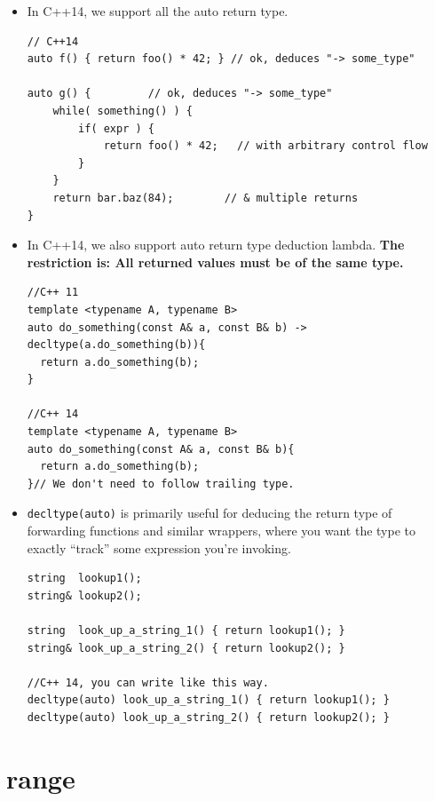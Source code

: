 \documentclass[a4paper,11pt,twoside]{book}
\begin{document}
\begin{itemize}
		\item In C++14, we support all the auto return type. 

\begin{lstlisting}
// C++14
auto f() { return foo() * 42; } // ok, deduces "-> some_type"

auto g() {         // ok, deduces "-> some_type"
    while( something() ) {
        if( expr ) {
            return foo() * 42;   // with arbitrary control flow
        }
    }
    return bar.baz(84);        // & multiple returns
}              
\end{lstlisting}

		\item In C++14, we also support auto return type deduction lambda. \textbf{The restriction is: All returned values must be of the same type.}

\begin{lstlisting}
//C++ 11
template <typename A, typename B>
auto do_something(const A& a, const B& b) -> decltype(a.do_something(b)){
  return a.do_something(b);
}

//C++ 14
template <typename A, typename B>
auto do_something(const A& a, const B& b){
  return a.do_something(b);
}// We don't need to follow trailing type.
\end{lstlisting}

		\item \texttt{decltype(auto)} is primarily useful for deducing the return type of forwarding functions and similar wrappers, where you want the type to exactly “track” some expression you’re invoking.
\begin{lstlisting}
string  lookup1();
string& lookup2();

string  look_up_a_string_1() { return lookup1(); }
string& look_up_a_string_2() { return lookup2(); }

//C++ 14, you can write like this way.
decltype(auto) look_up_a_string_1() { return lookup1(); }
decltype(auto) look_up_a_string_2() { return lookup2(); }
\end{lstlisting}

\end{itemize}

\section{range}
\end{document}
